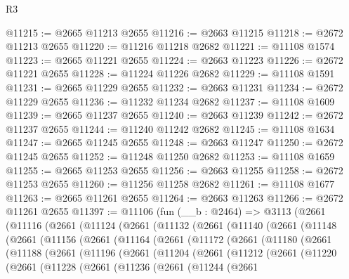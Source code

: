 \begin{lexlean}{R3}
\begin{coremodule}
@11215 := @2665 @11213 @2655
@11216 := @2663 @11215
@11218 := @2672 @11213 @2655
@11220 := @11216 @11218 @2682
@11221 := @11108 @1574
@11223 := @2665 @11221 @2655
@11224 := @2663 @11223
@11226 := @2672 @11221 @2655
@11228 := @11224 @11226 @2682
@11229 := @11108 @1591
@11231 := @2665 @11229 @2655
@11232 := @2663 @11231
@11234 := @2672 @11229 @2655
@11236 := @11232 @11234 @2682
@11237 := @11108 @1609
@11239 := @2665 @11237 @2655
@11240 := @2663 @11239
@11242 := @2672 @11237 @2655
@11244 := @11240 @11242 @2682
@11245 := @11108 @1634
@11247 := @2665 @11245 @2655
@11248 := @2663 @11247
@11250 := @2672 @11245 @2655
@11252 := @11248 @11250 @2682
@11253 := @11108 @1659
@11255 := @2665 @11253 @2655
@11256 := @2663 @11255
@11258 := @2672 @11253 @2655
@11260 := @11256 @11258 @2682
@11261 := @11108 @1677
@11263 := @2665 @11261 @2655
@11264 := @2663 @11263
@11266 := @2672 @11261 @2655
@11397 := @11106
    (fun (__b : @2464) =>
    @3113
      (@2661
        (@11116
          (@2661
            (@11124
              (@2661
                (@11132
                  (@2661
                    (@11140
                      (@2661
                        (@11148
                          (@2661
                            (@11156
                              (@2661
                                (@11164
                                  (@2661
                                    (@11172
                                      (@2661
                                        (@11180
                                          (@2661
                                            (@11188
                                              (@2661
                                                (@11196
                                                  (@2661
                                                    (@11204
                                                      (@2661
                                                        (@11212
                                                          (@2661
                                                            (@11220
                                                              (@2661
                                                                (@11228
                                                                  (@2661
                                                                    (@11236
                                                                      (@2661
                                                                        (@11244
                                                                          (@2661

\end{coremodule}
\end{lexlean}
